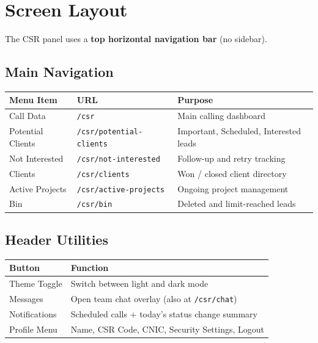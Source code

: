 \documentclass[11pt,a4paper]{article}
\begin{document}
\section{Screen Layout}

The CSR panel uses a \textbf{top horizontal navigation bar} (no sidebar).

\subsection{Main Navigation}

\begin{longtable}{@{}p{3.5cm}p{4.5cm}p{6.5cm}@{}}
\toprule
\textbf{Menu Item} & \textbf{URL} & \textbf{Purpose} \\
\midrule
\endhead
Call Data           & \texttt{/csr}                    & Main calling dashboard \\
Potential Clients   & \texttt{/csr/potential-clients}  & Important, Scheduled, Interested leads \\
Not Interested      & \texttt{/csr/not-interested}     & Follow-up and retry tracking \\
Clients             & \texttt{/csr/clients}             & Won / closed client directory \\
Active Projects     & \texttt{/csr/active-projects}     & Ongoing project management \\
Bin                 & \texttt{/csr/bin}                 & Deleted and limit-reached leads \\
\bottomrule
\end{longtable}

\subsection{Header Utilities}

\begin{longtable}{@{}p{3cm}p{11cm}@{}}
\toprule
\textbf{Button} & \textbf{Function} \\
\midrule
\endhead
Theme Toggle    & Switch between light and dark mode \\
Messages        & Open team chat overlay (also at \texttt{/csr/chat}) \\
Notifications   & Scheduled calls + today's status change summary \\
Profile Menu    & Name, CSR Code, CNIC, Security Settings, Logout \\
\bottomrule
\end{longtable}
\end{document}

